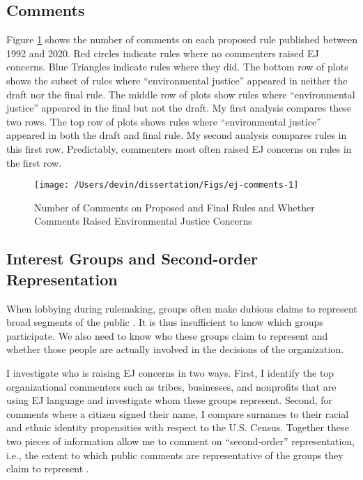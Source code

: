 \documentclass[
      12pt,
        ]{article}
\begin{document}
\hypertarget{comments}{%
\subsection{Comments}\label{comments}}

Figure \ref{fig:ej-comments} shows the number of comments on each proposed rule published between 1992 and 2020. Red circles indicate rules where no commenters raised EJ concerns. Blue Triangles indicate rules where they did. The bottom row of plots shows the subset of rules where ``environmental justice'' appeared in neither the draft nor the final rule. The middle row of plots show rules where ``environmental justice'' appeared in the final but not the draft. My first analysis compares these two rows. The top row of plots shows rules where ``environmental justice'' appeared in both the draft and final rule. My second analysis compares rules in this first row. Predictably, commenters most often raised EJ concerns on rules in the first row.

\begin{figure}

{\centering \texttt{[image: /Users/devin/dissertation/Figs/ej-comments-1]} 

}

\caption{Number of Comments on Proposed and Final Rules and Whether Comments Raised Environmental Justice Concerns}\label{fig:ej-comments}
\end{figure}

\hypertarget{interest-groups-and-second-order-representation}{%
\subsection{Interest Groups and Second-order Representation}\label{interest-groups-and-second-order-representation}}

When lobbying during rulemaking, groups often
make dubious claims to represent broad segments of the public \citep{Seifter2016UCLA}. It is thus insufficient to know which groups participate. We
also need to know who these groups claim to represent and whether those people are actually involved in the decisions of the organization.

I investigate who is raising EJ concerns in two ways.
First, I identify the top organizational commenters such as tribes,
businesses, and nonprofits that are using EJ language
and investigate whom these groups represent. Second, for comments where a
citizen signed their name, I compare surnames to their racial and ethnic
identity propensities with respect to the U.S. Census. Together these
two pieces of information allow me to comment on ``second-order'' representation, i.e., the extent to which public comments are
representative of the groups they claim to represent \citep{Seifter2016UCLA}.
\end{document}
